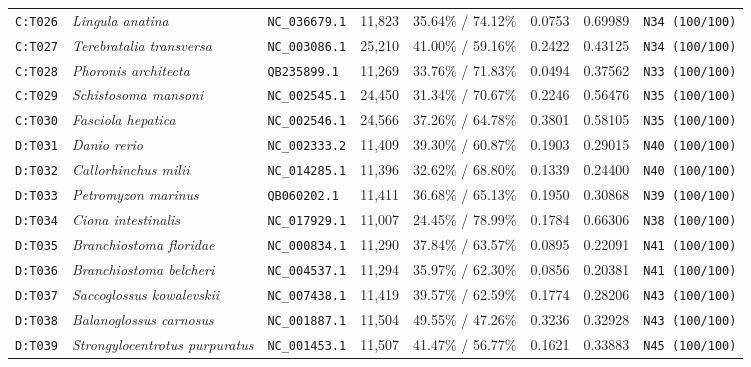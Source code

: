 \documentclass[10pt,letterpaper]{article}
\begin{document}
\begin{longtable}{llllllll}
\texttt{C:T026} & \textit{Lingula anatina} & \texttt{NC\_036679.1} & 11,823 & 35.64\% / 74.12\% & 0.0753 & 0.69989 & \texttt{N34 (100/100)} \\
\texttt{C:T027} & \textit{Terebratalia transversa} & \texttt{NC\_003086.1} & 25,210 & 41.00\% / 59.16\% & 0.2422 & 0.43125 & \texttt{N34 (100/100)} \\
\texttt{C:T028} & \textit{Phoronis architecta} & \texttt{QB235899.1} & 11,269 & 33.76\% / 71.83\% & 0.0494 & 0.37562 & \texttt{N33 (100/100)} \\
\texttt{C:T029} & \textit{Schistosoma mansoni} & \texttt{NC\_002545.1} & 24,450 & 31.34\% / 70.67\% & 0.2246 & 0.56476 & \texttt{N35 (100/100)} \\
\texttt{C:T030} & \textit{Fasciola hepatica} & \texttt{NC\_002546.1} & 24,566 & 37.26\% / 64.78\% & 0.3801 & 0.58105 & \texttt{N35 (100/100)} \\
\texttt{D:T031} & \textit{Danio rerio} & \texttt{NC\_002333.2} & 11,409 & 39.30\% / 60.87\% & 0.1903 & 0.29015 & \texttt{N40 (100/100)} \\
\texttt{D:T032} & \textit{Callorhinchus milii} & \texttt{NC\_014285.1} & 11,396 & 32.62\% / 68.80\% & 0.1339 & 0.24400 & \texttt{N40 (100/100)} \\
\texttt{D:T033} & \textit{Petromyzon marinus} & \texttt{QB060202.1} & 11,411 & 36.68\% / 65.13\% & 0.1950 & 0.30868 & \texttt{N39 (100/100)} \\
\texttt{D:T034} & \textit{Ciona intestinalis} & \texttt{NC\_017929.1} & 11,007 & 24.45\% / 78.99\% & 0.1784 & 0.66306 & \texttt{N38 (100/100)} \\
\texttt{D:T035} & \textit{Branchiostoma floridae} & \texttt{NC\_000834.1} & 11,290 & 37.84\% / 63.57\% & 0.0895 & 0.22091 & \texttt{N41 (100/100)} \\
\texttt{D:T036} & \textit{Branchiostoma belcheri} & \texttt{NC\_004537.1} & 11,294 & 35.97\% / 62.30\% & 0.0856 & 0.20381 & \texttt{N41 (100/100)} \\
\texttt{D:T037} & \textit{Saccoglossus kowalevskii} & \texttt{NC\_007438.1} & 11,419 & 39.57\% / 62.59\% & 0.1774 & 0.28206 & \texttt{N43 (100/100)} \\
\texttt{D:T038} & \textit{Balanoglossus carnosus} & \texttt{NC\_001887.1} & 11,504 & 49.55\% / 47.26\% & 0.3236 & 0.32928 & \texttt{N43 (100/100)} \\
\texttt{D:T039} & \textit{Strongylocentrotus purpuratus} & \texttt{NC\_001453.1} & 11,507 & 41.47\% / 56.77\% & 0.1621 & 0.33883 & \texttt{N45 (100/100)} \\

\end{longtable}
\end{document}
